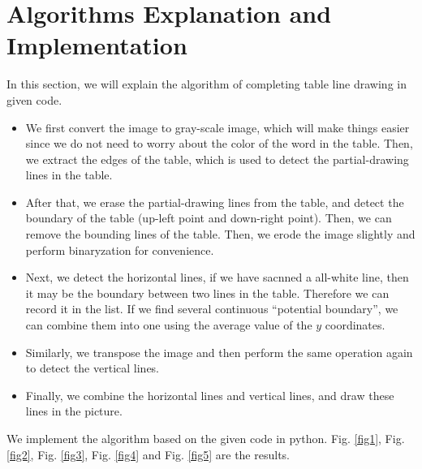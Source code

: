 \documentclass[12pt, a4paper]{article}
\theoremstyle{definition}
\begin{document}
\section{Algorithms Explanation and Implementation}
In this section, we will explain the algorithm of completing table line drawing in given code.

\begin{itemize}
	\item We first convert the image to gray-scale image, which will make things easier since we do not need to worry about the color of the word in the table. Then, we extract the edges of the table, which is used to detect the partial-drawing lines in the table.
	\item After that, we erase the partial-drawing lines from the table, and detect the boundary of the table (up-left point and down-right point). Then, we can remove the bounding lines of the table. Then, we erode the image slightly and perform binaryzation for convenience.
	\item Next, we detect the horizontal lines, if we have sacnned a all-white line, then it may be the boundary between two lines in the table. Therefore we can record it in the list. If we find several continuous ``potential boundary'', we can combine them into one using the average value of the $y$ coordinates.
	\item Similarly, we transpose the image and then perform the same operation again to detect the vertical lines.
	\item Finally, we combine the horizontal lines and vertical lines, and draw these lines in the picture.
\end{itemize}

We implement the algorithm based on the given code in python. Fig. \ref{fig1}, Fig. \ref{fig2}, Fig. \ref{fig3}, Fig. \ref{fig4} and Fig. \ref{fig5} are the results.
\end{document}
